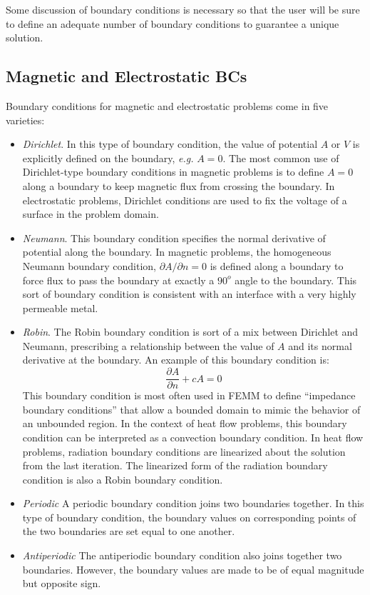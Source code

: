 \documentclass[12pt]{report}
\begin{document}
Some discussion of boundary conditions is necessary so that the
user will be sure to define an adequate number of boundary
conditions to guarantee a unique solution.  

\subsection{Magnetic and Electrostatic BCs}

Boundary conditions for magnetic and electrostatic problems come in five varieties:

\begin{itemize}
\item {\em Dirichlet}. In this type of boundary condition, the
value of potential $A$ or $V$ is explicitly defined on the
boundary, {\em e.g.} $A=0$.  The most common use of Dirichlet-type
boundary conditions in magnetic problems is to define $A=0$ along a
boundary to keep magnetic flux from crossing the boundary.  In
electrostatic problems, Dirichlet conditions are used to fix the
voltage of a surface in the problem domain.
\item {\em Neumann}. This boundary condition specifies the normal
derivative of potential along the boundary.  In magnetic problems,
the homogeneous Neumann boundary condition, $\partial A/\partial n
= 0$ is defined along a boundary to force flux to pass the boundary
at exactly a $90^o$ angle to the boundary. This sort of boundary
condition is consistent with an interface with a very highly
permeable metal.
\item {\em Robin}. The Robin boundary condition is sort of a mix
between Dirichlet and Neumann, prescribing a relationship between
the value of $A$ and its normal derivative at the boundary.  An
example of this boundary condition is:
\begin{displaymath}
\frac{\partial A}{\partial n} + c A = 0
\end{displaymath}
This boundary condition is most often used in FEMM to define ``impedance
boundary conditions'' that allow a bounded domain to mimic the
behavior of an unbounded region.  In the context of heat flow problems,
this boundary condition can be interpreted as a convection boundary condition.
In heat flow problems, radiation boundary conditions are linearized about 
the solution from the last iteration. The linearized form of the radiation
boundary condition is also a Robin boundary condition.
\item {\em Periodic}
A periodic boundary condition joins two boundaries together.  In this
type of boundary condition, the boundary values on 
corresponding points of the two boundaries are set equal to one another.
\item {\em Antiperiodic}
The antiperiodic boundary condition also joins together two boundaries.
However, the boundary values are made to be of equal magnitude but
opposite sign.
\end{itemize}
\end{document}
